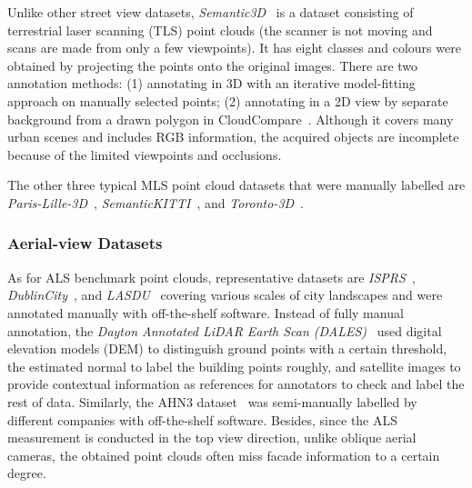 Unlike other street view datasets, \emph{Semantic3D}~\citep{hackel2017semantic3d} is a dataset consisting of terrestrial laser scanning (TLS) point clouds (the scanner is not moving and scans are made from only a few viewpoints).
It has eight classes and colours were obtained by projecting the points onto the original images.
There are two annotation methods: (1) annotating in 3D with an iterative model-fitting approach on manually selected points; (2) annotating in a 2D view by separate background from a drawn polygon in CloudCompare~\citep{Girardeau-Montaut2016}.
Although it covers many urban scenes and includes RGB information, the acquired objects are incomplete because of the limited viewpoints and occlusions. 

The other three typical MLS point cloud datasets that were manually labelled are \emph{Paris-Lille-3D}~\citep{roynard2018paris}, \emph{SemanticKITTI}~\citep{behley2019semantickitti}, and \emph{Toronto-3D}~\citep{tan2020toronto}. 


\subsubsection{Aerial-view Datasets}
As for ALS benchmark point clouds, representative datasets are \emph{ISPRS}~\citep{niemeyer2014contextual}, \emph{DublinCity}~\citep{zolanvari2019dublincity}, and \emph{LASDU}~\citep{ye2020lasdu} covering various scales of city landscapes and were annotated manually with off-the-shelf software. 
Instead of fully manual annotation, the \emph{Dayton Annotated LiDAR Earth Scan (DALES)}~\citep{varney2020dales} used digital elevation models (DEM) to distinguish ground points with a certain threshold, the estimated normal to label the building points roughly, and satellite images to provide contextual information as references for annotators to check and label the rest of data.
Similarly, the AHN3 dataset~\citep{ahn2019} was semi-manually labelled by different companies with off-the-shelf software.
Besides, since the ALS measurement is conducted in the top view direction, unlike oblique aerial cameras, the obtained point clouds often miss facade information to a certain degree. 
